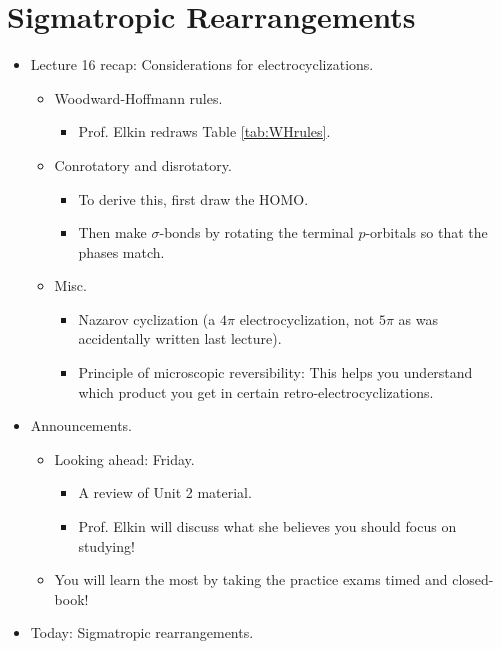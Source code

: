 \documentclass[../notes.tex]{subfiles}
\begin{document}
\section{Sigmatropic Rearrangements}
\begin{itemize}
    \item {}Lecture 16 recap: Considerations for electrocyclizations.
    \begin{itemize}
        \item Woodward-Hoffmann rules.
        \begin{itemize}
            \item Prof. Elkin redraws Table \ref{tab:WHrules}.
        \end{itemize}
        \item Conrotatory and disrotatory.
        \begin{itemize}
            \item To derive this, first draw the HOMO.
            \item Then make $\sigma$-bonds by rotating the terminal $p$-orbitals so that the phases match.
        \end{itemize}
        \item Misc.
        \begin{itemize}
            \item Nazarov cyclization (a $4\pi$ electrocyclization, not $5\pi$ as was accidentally written last lecture).
            \item Principle of microscopic reversibility: This helps you understand which product you get in certain retro-electrocyclizations.
        \end{itemize}
    \end{itemize}
    \pagebreak
    \item Announcements.
    \begin{itemize}
        \item Looking ahead: Friday.
        \begin{itemize}
            \item A review of Unit 2 material.
            \item Prof. Elkin will discuss what she believes you should focus on studying!
        \end{itemize}
        \item You will learn the most by taking the practice exams timed and closed-book!
    \end{itemize}
    \item Today: Sigmatropic rearrangements.

\end{itemize}
\end{document}
